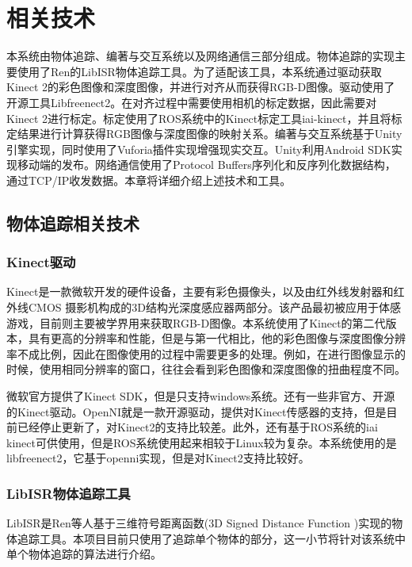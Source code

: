 \chapter{相关技术}
\label{chap:tech}

本系统由物体追踪、编著与交互系统以及网络通信三部分组成。物体追踪的实现主要使用了Ren的LibISR物体追踪工具\cite{Ren_3DV_2014,star3d_iccv_2013}。为了适配该工具，本系统通过驱动获取Kinect 2的彩色图像和深度图像，并进行对齐从而获得RGB-D图像。驱动使用了开源工具Libfreenect2\cite{libfreenect2}。在对齐过程中需要使用相机的标定数据，因此需要对Kinect 2进行标定。标定使用了ROS系统中的Kinect标定工具iai-kinect\cite{iai_kinect2}，并且将标定结果进行计算获得RGB图像与深度图像的映射关系。编著与交互系统基于Unity引擎\cite{Unity}实现，同时使用了Vuforia插件\cite{Vuforia}实现增强现实交互。Unity利用Android SDK\cite{Android}实现移动端的发布。网络通信使用了Protocol Buffers\cite{Protobuf, ProtobufNet}序列化和反序列化数据结构，通过TCP/IP收发数据。本章将详细介绍上述技术和工具。

\section{物体追踪相关技术}
\subsection{Kinect驱动}
Kinect是一款微软开发的硬件设备，主要有彩色摄像头，以及由红外线发射器和红外线CMOS 摄影机构成的3D结构光深度感应器两部分。该产品最初被应用于体感游戏，目前则主要被学界用来获取RGB-D图像。本系统使用了Kinect的第二代版本，具有更高的分辨率和性能，但是与第一代相比，他的彩色图像与深度图像分辨率不成比例，因此在图像使用的过程中需要更多的处理。例如，在进行图像显示的时候，使用相同分辨率的窗口，往往会看到彩色图像和深度图像的扭曲程度不同。

微软官方提供了Kinect SDK，但是只支持windows系统。还有一些非官方、开源的Kinect驱动。OpenNI\cite{Openni}就是一款开源驱动，提供对Kinect传感器的支持，但是目前已经停止更新了，对Kinect2的支持比较差。此外，还有基于ROS系统的iai kinect\cite{iai_kinect2}可供使用，但是ROS系统使用起来相较于Linux较为复杂。本系统使用的是libfreenect2\cite{libfreenect2}，它基于openni实现，但是对Kinect2支持比较好。

\subsection{LibISR物体追踪工具}
LibISR是Ren等人基于三维符号距离函数(3D Signed Distance Function )实现的物体追踪工具\cite{Ren_3DV_2014, star3d_iccv_2013}。本项目目前只使用了追踪单个物体的部分，这一小节将针对该系统中单个物体追踪的算法进行介绍\cite{ren2017real}。

